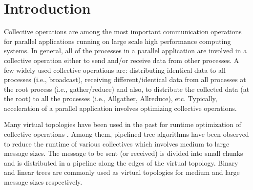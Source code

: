 \documentclass[sigplan,review,anonymous]{acmart}\settopmatter{printfolios=true,printccs=false,printacmref=false}
\begin{document}
\newcommand{\tablefont}{\fontsize{6}{6}\selectfont}

\maketitle


\section{Introduction}
Collective operations are among the most important communication operations for parallel applications running on large scale high performance computing systems. In general, all of the processes in a parallel application are involved in a collective operation either to send and/or receive data from other processes. A few widely used collective operations are: distributing identical data to all processes (i.e., broadcast), receiving different/identical data from all processes at the root process (i.e., gather/reduce) and also, to distribute the collected data (at the root) to all the processes (i.e., Allgather, Allreduce), etc.  Typically, acceleration of a parallel application involves optimizing collective operations.

Many virtual topologies have been used in the past for runtime optimization of collective operations \cite{hoefler-moor-collectives}. Among them, pipelined tree algorithms have been observed to reduce the runtime of various collectives which involves medium to large message sizes. The message to be sent (or received) is divided into small chunks and is distributed in a pipeline along the edges of the virtual topology.  Binary and linear trees are commonly used as virtual topologies for medium and large message sizes respectively. 
\end{document}
